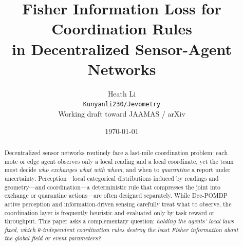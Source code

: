 \documentclass[11pt,a4paper]{article}
\title{Fisher Information Loss for Coordination Rules\\
in Decentralized Sensor-Agent Networks}
\author{
  Heath Li\\
  \texttt{Kunyanli230/Jevometry}\\
  \small Working draft toward JAAMAS / arXiv
}
\date{\today}
\begin{document}
\maketitle

\begin{abstract}
Decentralized sensor networks routinely face a last-mile coordination problem:
each mote or edge agent observes only a local reading and a local coordinate,
yet the team must decide \emph{who exchanges what with whom}, and when to
\emph{quarantine} a report under uncertainty. Perception---local categorical
distributions induced by readings and geometry---and coordination---a
deterministic rule that compresses the joint into exchange or quarantine
actions---are often designed separately. While Dec-POMDP active perception
and information-driven sensing carefully treat what to observe, the
coordination layer is frequently heuristic and evaluated only by task reward
or throughput. This paper asks a complementary question: \emph{holding the
agents' local laws fixed, which $\theta$-independent coordination rules
destroy the least Fisher information about the global field or event
parameters?}


\end{abstract}
\end{document}

